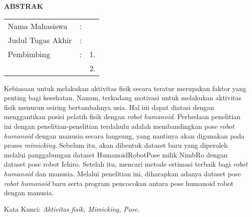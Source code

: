 \begin{center}
  \large\textbf{ABSTRAK}
\end{center}


\vspace{2ex}

\begingroup
\setlength{\tabcolsep}{0pt}

\noindent
\begin{tabularx}{\textwidth}{l >{\centering}m{2em} X}
  Nama Mahasiswa    & : & \name{}         \\

  Judul Tugas Akhir & : & \tatitle{}      \\

  Pembimbing        & : & 1. \advisor{}   \\
                    &   & 2. \coadvisor{} \\
\end{tabularx}
\endgroup

Kebiasaan untuk melakukan aktivitas fisik secara teratur merupakan faktor yang penting bagi kesehatan. 
Namun, terkadang motivasi untuk melakukan aktivitas fisik menurun seiring bertambahnya usia.
Hal ini dapat diatasi dengan menggantikan posisi pelatih fisik dengan \emph{robot humanoid}. 
Perbedaan penelitian ini dengan penelitian-penelitian terdahulu adalah membandingkan pose \emph{robot humanoid} dengan manusia secara langsung, 
yang nantinya akan digunakan pada proses \emph{mimicking}. 
Sebelum itu, akan dibentuk dataset baru yang diperoleh melalui panggabungan  dataset HumanoidRobotPose milik NimbRo dengan dataset pose robot Ichiro. 
Setelah itu, mencari metode estimasi terbaik bagi \emph{robot humanoid} dan manusia. 
Melalui penelitian ini, diharapkan adanya dataset pose \emph{robot humanoid} baru serta program pencocokan antara pose humanoid robot dengan manusia.

Kata Kunci: \emph{Aktivitas fisik, Mimicking, Pose}.
